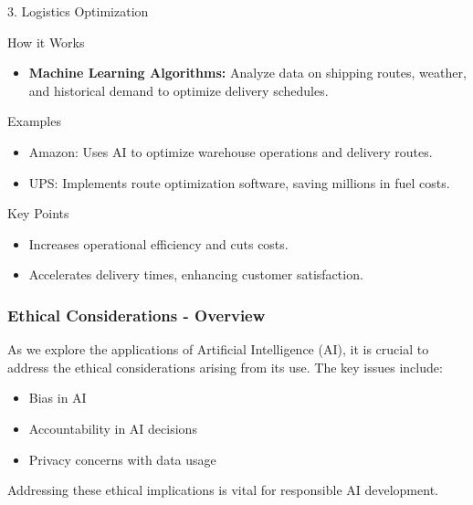 \documentclass[aspectratio=169]{beamer}
\begin{document}
\begin{frame}[fragile]
\begin{block}{3. Logistics Optimization}
        \begin{block}{How it Works}
            \begin{itemize}
                \item \textbf{Machine Learning Algorithms:} Analyze data on shipping routes, weather, and historical demand to optimize delivery schedules.
            \end{itemize}
        \end{block}
        
        \begin{block}{Examples}
            \begin{itemize}
                \item Amazon: Uses AI to optimize warehouse operations and delivery routes.
                \item UPS: Implements route optimization software, saving millions in fuel costs.
            \end{itemize}
        \end{block}
        
        \begin{block}{Key Points}
            \begin{itemize}
                \item Increases operational efficiency and cuts costs.
                \item Accelerates delivery times, enhancing customer satisfaction.
            \end{itemize}
        \end{block}
    \end{block}

\end{frame}

\begin{frame}[fragile]
    \frametitle{Ethical Considerations - Overview}
    As we explore the applications of Artificial Intelligence (AI), it is crucial to address the ethical considerations arising from its use. The key issues include:
    \begin{itemize}
        \item Bias in AI
        \item Accountability in AI decisions
        \item Privacy concerns with data usage
    \end{itemize}
    Addressing these ethical implications is vital for responsible AI development.
\end{frame}
\end{document}
